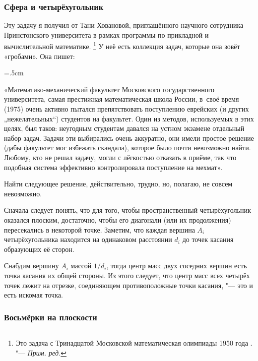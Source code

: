 \documentclass[twoside]{book}
\begin{document}
\subsubsection*{Сфера и четырёхугольник}%

Эту задачу я получил от Тани Ховановой, приглашённого научного сотрудника Принстонского университета в рамках программы по прикладной и вычислительной математике.%
\footnote{Это задача с Тринадцатой Московской математическая олимпиады 1950 года
\cite[13.17]{МосковскиеМО}. "--- \emph{Прим. ред.}}
У неё есть коллекция задач, которые она зовёт «гробами».
Она пишет:

\medskip

\begin{trivlist}\leftskip=5mm\rightskip=.5cm
  \small
\item\relax«Математико-механический факультет Московского государственного университета, самая престижная математическая школа России, в~своё время (1975) очень активно пытался препятствовать поступлению еврейских (и других „нежелательных“) студентов на факультет.
Один из методов, используемых в этих целях, был таков: неугодным студентам давался на устном экзамене отдельный набор задач.
Задачи эти выбирались очень аккуратно, они имели простое решение (дабы факультет мог избежать скандала), которое было почти невозможно найти.
Любому, кто не решал задачу, могли с лёгкостью отказать в приёме, так что подобная система эффективно контролировала поступление на мехмат». 
\end{trivlist}

\medskip

Найти следующее решение, действительно, трудно, но, полагаю, не совсем невозможно.

\medskip

Сначала следует понять, что для того, чтобы пространственный четырёхугольник оказался плоским, достаточно, чтобы его диагонали (или их продолжения) пересекались в некоторой точке.
Заметим, что каждая вершина $A_i$ четырёхугольника находится на одинаковом расстоянии $d_i$ до точек касания образующих её сторон.

Снабдим вершину $A_i$ массой $1/d_i$, тогда центр масс двух соседних вершин есть точка касания их общей стороны.
Из этого следует, что центр масс всех четырёх точек лежит на отрезке, соединяющем противоположные точки касания, "--- это и есть искомая точка.
\heart

\subsubsection*{Восьмёрки на плоскости}%
\end{document}

